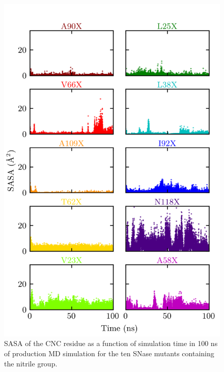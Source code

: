 \begin{figure}
    \center
    \includegraphics[width=\single]{figures-snase/sasa_sidechain_v_time.png}
    \caption[SASA of the CNC residue in each SNase location]{
        SASA of the CNC residue as a function of simulation time in 100 ns of production MD simulation for the ten SNase mutants containing the nitrile group.
    }
    \label{fig:snase-sasa}
\end{figure}

